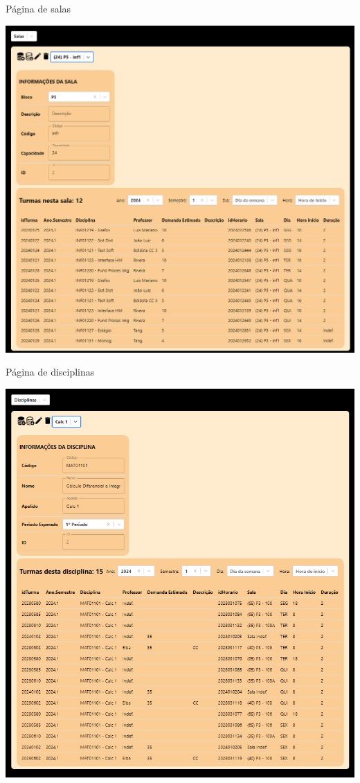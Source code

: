\begin{MyCenteredFigure} \caption{Página de salas} \label{fig:pagina_salas}
  \includegraphics[width=\textwidth]{files/img/2.02!7-resultados/8-Salas.png}
\end{MyCenteredFigure}

\begin{MyCenteredFigure} \caption{Página de disciplinas} \label{fig:pagina_disciplinas}
  \includegraphics[width=\textwidth]{files/img/2.02!7-resultados/9-Disciplinas.png}
\end{MyCenteredFigure}

